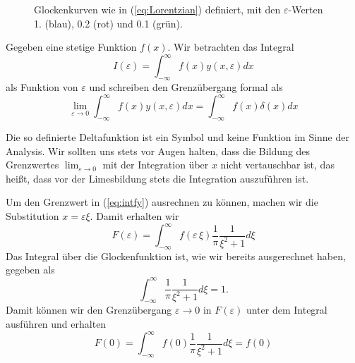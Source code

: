 \begin{figure}
  \begin{center}
  \end{center}
  \caption{\label{fig:Glockenkurven}Glockenkurven wie in (\ref{eq:Lorentzian})
  definiert, mit den $\varepsilon$-Werten 1. (blau), 0.2 (rot) und 0.1 (grün).}
\end{figure}
Gegeben eine stetige Funktion $f(x)$. Wir betrachten das Integral
\[I(\varepsilon)=\int_{-\infty}^{\infty}f(x)y(x,\varepsilon)dx\]
als Funktion von $\varepsilon$ und schreiben den Grenzübergang formal als
\begin{equation}\label{eq:intfy}
  \lim_{\varepsilon\rightarrow 0}\int_{-\infty}^{\infty}f(x)y(x,\varepsilon)dx=
\int_{-\infty}^{\infty}f(x)\delta(x)dx
\end{equation}

Die so definierte Deltafunktion ist ein Symbol und keine Funktion im Sinne der
Analysis. Wir sollten uns stets vor Augen halten, dass die Bildung des
Grenzwertes $\lim_{\varepsilon\rightarrow 0}$ mit der Integration über $x$
nicht vertauschbar ist, das heißt, dass vor der Limesbildung stets die
Integration auszuführen ist.\vspace{1cm}

Um den Grenzwert in (\ref{eq:intfy}) ausrechnen zu können, machen wir die
Substitution $x=\varepsilon\xi$. Damit erhalten wir
\[ F(\varepsilon)=\int_{-\infty}^{\infty}f(\varepsilon\,\xi)
\frac{1}{\pi}\frac{1}{\xi^2+1}d\xi\]
Das Integral über die Glockenfunktion ist, wie wir bereits ausgerechnet haben,
gegeben als
\[\int_{-\infty}^{\infty}\frac{1}{\pi}\frac{1}{\xi^2+1}d\xi=1.\]
Damit können wir den Grenzübergang $\varepsilon\rightarrow 0$ in
$F(\varepsilon)$ unter dem Integral ausführen und erhalten
\[F(0)=\int_{-\infty}^{\infty}f(0)
\frac{1}{\pi}\frac{1}{\xi^2+1}d\xi=f(0)\]
